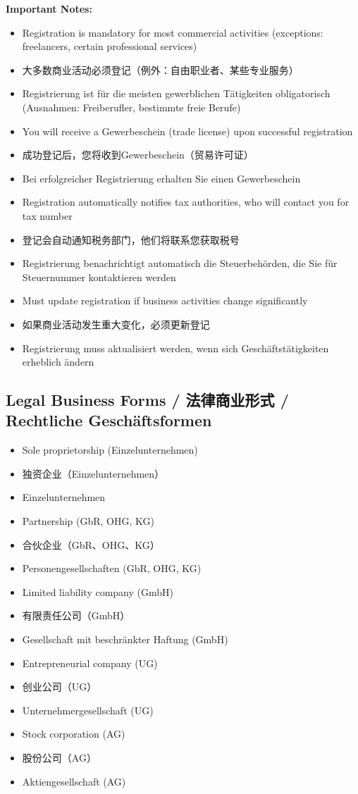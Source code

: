 \textbf{Important Notes:}
\begin{itemize}
    \item Registration is mandatory for most commercial activities (exceptions: freelancers, certain professional services)
    \item 大多数商业活动必须登记（例外：自由职业者、某些专业服务）
    \item Registrierung ist für die meisten gewerblichen Tätigkeiten obligatorisch (Ausnahmen: Freiberufler, bestimmte freie Berufe)
    
    \item You will receive a Gewerbeschein (trade license) upon successful registration
    \item 成功登记后，您将收到Gewerbeschein（贸易许可证）
    \item Bei erfolgreicher Registrierung erhalten Sie einen Gewerbeschein
    
    \item Registration automatically notifies tax authorities, who will contact you for tax number
    \item 登记会自动通知税务部门，他们将联系您获取税号
    \item Registrierung benachrichtigt automatisch die Steuerbehörden, die Sie für Steuernummer kontaktieren werden
    
    \item Must update registration if business activities change significantly
    \item 如果商业活动发生重大变化，必须更新登记
    \item Registrierung muss aktualisiert werden, wenn sich Geschäftstätigkeiten erheblich ändern
\end{itemize}

\subsection{Legal Business Forms / 法律商业形式 / Rechtliche Geschäftsformen}
\begin{itemize}
    \item Sole proprietorship (Einzelunternehmen)
    \item 独资企业（Einzelunternehmen）
    \item Einzelunternehmen
    \item Partnership (GbR, OHG, KG)
    \item 合伙企业（GbR、OHG、KG）
    \item Personengesellschaften (GbR, OHG, KG)
    \item Limited liability company (GmbH)
    \item 有限责任公司（GmbH）
    \item Gesellschaft mit beschränkter Haftung (GmbH)
    \item Entrepreneurial company (UG)
    \item 创业公司（UG）
    \item Unternehmergesellschaft (UG)
    \item Stock corporation (AG)
    \item 股份公司（AG）
    \item Aktiengesellschaft (AG)
\end{itemize}

